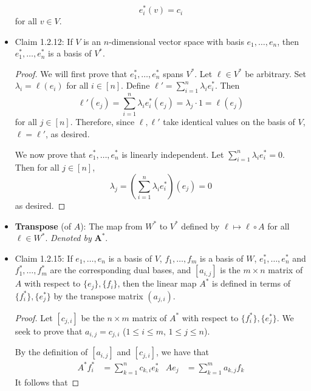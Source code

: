 \documentclass[../notes.tex]{subfiles}
\begin{document}
\begin{itemize}
    \begin{equation*}
        e_i^*(v) = c_i
    \end{equation*}
    for all $v\in V$.
    \item Claim 1.2.12: If $V$ is an $n$-dimensional vector space with basis $e_1,\dots,e_n$, then $e_1^*,\dots,e_n^*$ is a basis of $V^*$.
    \begin{proof}
        We will first prove that $e_1^*,\dots,e_n^*$ spans $V^*$. Let $\ell\in V^*$ be arbitrary. Set $\lambda_i=\ell(e_i)$ for all $i\in[n]$. Define $\ell'=\sum_{i=1}^n\lambda_ie_i^*$. Then
        \begin{equation*}
            \ell'(e_j) = \sum_{i=1}^n\lambda_ie_i^*(e_j)
            = \lambda_j\cdot 1
            = \ell(e_j)
        \end{equation*}
        for all $j\in[n]$. Therefore, since $\ell,\ell'$ take identical values on the basis of $V$, $\ell=\ell'$, as desired.\par
        We now prove that $e_1^*,\dots,e_n^*$ is linearly independent. Let $\sum_{i=1}^n\lambda_ie_i^*=0$. Then for all $j\in[n]$,
        \begin{equation*}
            \lambda_j = \left( \sum_{i=1}^n\lambda_ie_i^* \right)(e_j)
            = 0
        \end{equation*}
        as desired.
    \end{proof}
    \item \textbf{Transpose} (of $A$): The map from $W^*$ to $V^*$ defined by $\ell\mapsto\ell\circ A$ for all $\ell\in W^*$. \emph{Denoted by} $\bm{A^*}$.
    \item Claim 1.2.15: If $e_1,\dots,e_n$ is a basis of $V$, $f_1,\dots,f_m$ is a basis of $W$, $e_1^*,\dots,e_n^*$ and $f_1^*,\dots,f_m^*$ are the corresponding dual bases, and $[a_{i,j}]$ is the $m\times n$ matrix of $A$ with respect to $\{e_j\},\{f_i\}$, then the linear map $A^*$ is defined in terms of $\{f_i^*\},\{e_j^*\}$ by the transpose matrix $(a_{j,i})$.
    \begin{proof}
        Let $[c_{j,i}]$ be the $n\times m$ matrix of $A^*$ with respect to $\{f_i^*\},\{e_j^*\}$. We seek to prove that $a_{i,j}=c_{j,i}$ ($1\leq i\leq m$, $1\leq j\leq n$).\par
        By the definition of $[a_{i,j}]$ and $[c_{j,i}]$, we have that
        \begin{align*}
            A^*f_i^* &= \sum_{k=1}^nc_{k,i}e_k^*&
            Ae_j &= \sum_{k=1}^ma_{k,j}f_k
        \end{align*}
        It follows that

\end{proof}
\end{itemize}
\end{document}

